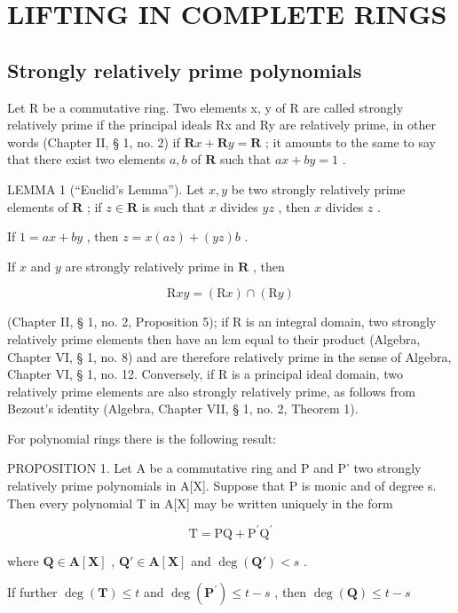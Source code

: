 \section{LIFTING IN COMPLETE RINGS}

\subsection{Strongly relatively prime polynomials}

Let R be a commutative ring. Two elements x, y of R are called strongly relatively prime if the principal ideals Rx and Ry are relatively prime, in other words (Chapter II, § 1, no. 2) if \(\mathbf{R}x + \mathbf{R}y = \mathbf{R}\) ; it amounts to the same to say that there exist two elements \(a, b\) of \(\mathbf{R}\) such that \(ax + by = 1\) .

LEMMA 1 (``Euclid's Lemma''). Let \(x, y\) be two strongly relatively prime elements of \(\mathbf{R}\) ; if \(z \in \mathbf{R}\) is such that \(x\) divides \(yz\) , then \(x\) divides \(z\) .

If \(1 = ax + by\) , then \(z = x(az) + (yz)b\) .

If \(x\) and \(y\) are strongly relatively prime in \(\mathbf{R}\) , then

\[
\mathrm{R} x y = (\mathrm{R} x) \cap (\mathrm{R} y)
\]

(Chapter II, § 1, no. 2, Proposition 5); if R is an integral domain, two strongly relatively prime elements then have an lcm equal to their product (Algebra, Chapter VI, § 1, no. 8) and are therefore relatively prime in the sense of Algebra, Chapter VI, § 1, no. 12. Conversely, if R is a principal ideal domain, two relatively prime elements are also strongly relatively prime, as follows from Bezout's identity (Algebra, Chapter VII, § 1, no. 2, Theorem 1).

For polynomial rings there is the following result:

PROPOSITION 1. Let A be a commutative ring and P and P' two strongly relatively prime polynomials in A{[}X{]}. Suppose that P is monic and of degree s. Then every polynomial T in A{[}X{]} may be written uniquely in the form

\[
\mathrm{T} = \mathrm{PQ} + \mathrm{P} ^ {\prime} \mathrm{Q} ^ {\prime}\tag{1}
\]

where \(\mathbf{Q} \in \mathbf{A}[\mathbf{X}]\) , \(\mathbf{Q}' \in \mathbf{A}[\mathbf{X}]\) and \(\deg(\mathbf{Q}') < s\) .

If further \(\deg (\mathbf{T})\leqslant t\) and \(\deg (\mathbf{P}^{\prime})\leqslant t - s\) , then \(\deg (\mathbf{Q})\leqslant t - s\)

